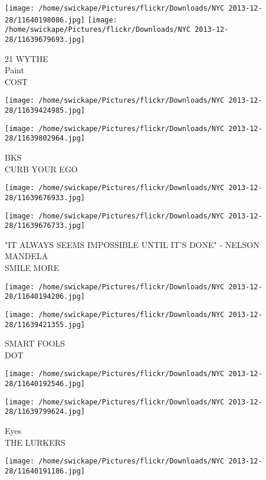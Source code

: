 \documentclass[10pt,letterpaper]{article}
\begin{document}
\vspace{0.25in}
\texttt{[image: /home/swickape/Pictures/flickr/Downloads/NYC 2013-12-28/11640198086.jpg]}
\texttt{[image: /home/swickape/Pictures/flickr/Downloads/NYC 2013-12-28/11639679693.jpg]}

21 WYTHE\\
Paint\\
COST\\
\pagebreak

\texttt{[image: /home/swickape/Pictures/flickr/Downloads/NYC 2013-12-28/11639424985.jpg]}

\vspace{0.25in}
\texttt{[image: /home/swickape/Pictures/flickr/Downloads/NYC 2013-12-28/11639802964.jpg]}

BKS\\
CURB YOUR EGO\\
\pagebreak

\texttt{[image: /home/swickape/Pictures/flickr/Downloads/NYC 2013-12-28/11639676933.jpg]}

\vspace{0.25in}
\texttt{[image: /home/swickape/Pictures/flickr/Downloads/NYC 2013-12-28/11639676733.jpg]}

"IT ALWAYS SEEMS IMPOSSIBLE UNTIL IT'S DONE" {-} NELSON MANDELA\\
SMILE MORE\\
\pagebreak

\texttt{[image: /home/swickape/Pictures/flickr/Downloads/NYC 2013-12-28/11640194206.jpg]}

\vspace{0.25in}
\texttt{[image: /home/swickape/Pictures/flickr/Downloads/NYC 2013-12-28/11639421355.jpg]}

SMART FOOLS\\
DOT\\
\pagebreak

\texttt{[image: /home/swickape/Pictures/flickr/Downloads/NYC 2013-12-28/11640192546.jpg]}

\vspace{0.25in}
\texttt{[image: /home/swickape/Pictures/flickr/Downloads/NYC 2013-12-28/11639799624.jpg]}

Eyes\\
THE LURKERS\\
\pagebreak

\texttt{[image: /home/swickape/Pictures/flickr/Downloads/NYC 2013-12-28/11640191186.jpg]}
\end{document}
